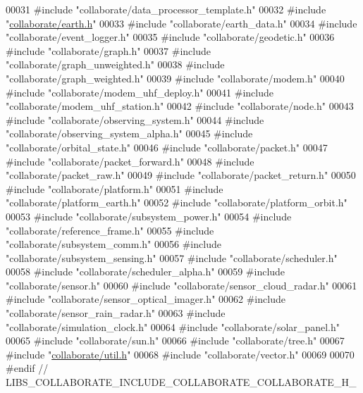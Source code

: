 \begin{DoxyCode}
00031 \textcolor{preprocessor}{#include "collaborate/data\_processor\_template.h"}
00032 \textcolor{preprocessor}{#include "\hyperlink{earth_8h}{collaborate/earth.h}"}
00033 \textcolor{preprocessor}{#include "collaborate/earth\_data.h"}
00034 \textcolor{preprocessor}{#include "collaborate/event\_logger.h"}
00035 \textcolor{preprocessor}{#include "collaborate/geodetic.h"}
00036 \textcolor{preprocessor}{#include "collaborate/graph.h"}
00037 \textcolor{preprocessor}{#include "collaborate/graph\_unweighted.h"}
00038 \textcolor{preprocessor}{#include "collaborate/graph\_weighted.h"}
00039 \textcolor{preprocessor}{#include "collaborate/modem.h"}
00040 \textcolor{preprocessor}{#include "collaborate/modem\_uhf\_deploy.h"}
00041 \textcolor{preprocessor}{#include "collaborate/modem\_uhf\_station.h"}
00042 \textcolor{preprocessor}{#include "collaborate/node.h"}
00043 \textcolor{preprocessor}{#include "collaborate/observing\_system.h"}
00044 \textcolor{preprocessor}{#include "collaborate/observing\_system\_alpha.h"}
00045 \textcolor{preprocessor}{#include "collaborate/orbital\_state.h"}
00046 \textcolor{preprocessor}{#include "collaborate/packet.h"}
00047 \textcolor{preprocessor}{#include "collaborate/packet\_forward.h"}
00048 \textcolor{preprocessor}{#include "collaborate/packet\_raw.h"}
00049 \textcolor{preprocessor}{#include "collaborate/packet\_return.h"}
00050 \textcolor{preprocessor}{#include "collaborate/platform.h"}
00051 \textcolor{preprocessor}{#include "collaborate/platform\_earth.h"}
00052 \textcolor{preprocessor}{#include "collaborate/platform\_orbit.h"}
00053 \textcolor{preprocessor}{#include "collaborate/subsystem\_power.h"}
00054 \textcolor{preprocessor}{#include "collaborate/reference\_frame.h"}
00055 \textcolor{preprocessor}{#include "collaborate/subsystem\_comm.h"}
00056 \textcolor{preprocessor}{#include "collaborate/subsystem\_sensing.h"}
00057 \textcolor{preprocessor}{#include "collaborate/scheduler.h"}
00058 \textcolor{preprocessor}{#include "collaborate/scheduler\_alpha.h"}
00059 \textcolor{preprocessor}{#include "collaborate/sensor.h"}
00060 \textcolor{preprocessor}{#include "collaborate/sensor\_cloud\_radar.h"}
00061 \textcolor{preprocessor}{#include "collaborate/sensor\_optical\_imager.h"}
00062 \textcolor{preprocessor}{#include "collaborate/sensor\_rain\_radar.h"}
00063 \textcolor{preprocessor}{#include "collaborate/simulation\_clock.h"}
00064 \textcolor{preprocessor}{#include "collaborate/solar\_panel.h"}
00065 \textcolor{preprocessor}{#include "collaborate/sun.h"}
00066 \textcolor{preprocessor}{#include "collaborate/tree.h"}
00067 \textcolor{preprocessor}{#include "\hyperlink{util_8h}{collaborate/util.h}"}
00068 \textcolor{preprocessor}{#include "collaborate/vector.h"}
00069 
00070 \textcolor{preprocessor}{#endif  // LIBS\_COLLABORATE\_INCLUDE\_COLLABORATE\_COLLABORATE\_H\_}
\end{DoxyCode}
